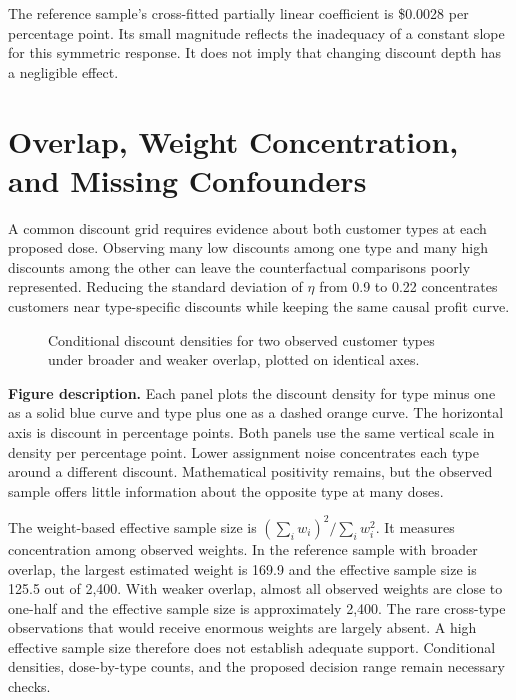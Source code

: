 The reference sample's cross-fitted partially linear coefficient is
\$0.0028 per percentage point. Its small magnitude reflects the
inadequacy of a constant slope for this symmetric response. It does not
imply that changing discount depth has a negligible effect.

\hypertarget{M06-overlap-weight-concentration-and-missing-confounders}{%
\section{Overlap, Weight Concentration, and Missing
Confounders}\label{M06-overlap-weight-concentration-and-missing-confounders}}

\noindent \noindent A common discount grid requires evidence about both customer
types at each proposed dose. Observing many low discounts among one type
and many high discounts among the other can leave the counterfactual
comparisons poorly represented. Reducing the standard deviation of
\(\eta\) from 0.9 to 0.22 concentrates customers near type-specific
discounts while keeping the same causal profit curve.

\begin{figure}[htbp]
\centering

\caption{Conditional discount densities for two observed customer types under broader and weaker overlap, plotted on identical axes.}\label{fig:M06_dose_overlap}
\end{figure}

\textbf{Figure description.} Each panel plots the discount density for
type minus one as a solid blue curve and type plus one as a dashed
orange curve. The horizontal axis is discount in percentage points. Both
panels use the same vertical scale in density per percentage point.
Lower assignment noise concentrates each type around a different
discount. Mathematical positivity remains, but the observed sample
offers little information about the opposite type at many doses.

The weight-based effective sample size is
\((\sum_i w_i)^2/\sum_i w_i^2\). It measures concentration among
observed weights. In the reference sample with broader overlap, the
largest estimated weight is 169.9 and the effective sample size is 125.5
out of 2,400. With weaker overlap, almost all observed weights are close
to one-half and the effective sample size is approximately 2,400. The
rare cross-type observations that would receive enormous weights are
largely absent. A high effective sample size therefore does not
establish adequate support. Conditional densities, dose-by-type counts,
and the proposed decision range remain necessary checks.

